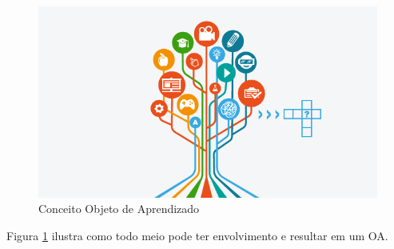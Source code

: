 \documentclass[12pt,openright,oneside,a4paper,english,french,spanish,brazil]{unifil}
\begin{document}
%
%
%


\tableofcontents*

  \setlength\absleftindent{0cm}
  \setlength\absrightindent{0cm}
  
  \abstracttextfont{\normalfont\normalsize}

  \setlength{\absparindent}{0pt}
  \setlength{\absparsep}{18pt}

\listoffigures*

\begin{figure}[htb]
	\centering
	\includegraphics[scale=0.5]{images/arvore.png}
	\caption{Conceito Objeto de Aprendizado}
	\label{img:arvore}
\end{figure}
Figura \ref{img:arvore} ilustra como todo meio pode ter envolvimento e resultar em um OA.
\end{document}
